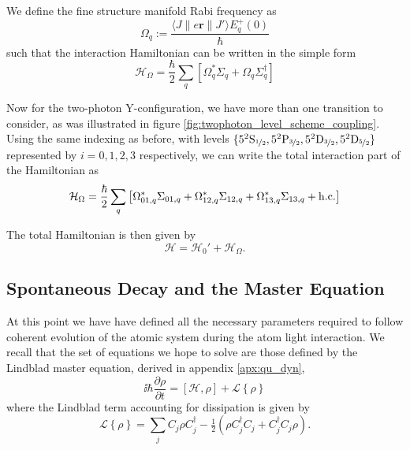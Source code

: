     We define the fine structure manifold Rabi frequency as 
    \begin{equation}
      \Omega_q := \frac{\langle J  \| e \mathbf{r} \| J' \rangle E^+_q(0)}{\hbar}
    \end{equation}
    such that the interaction Hamiltonian can be written in the simple form
    \begin{equation}
      \mathcal{H}_\Omega = \frac{\hbar}{2} \sum_q \left[ \Omega^*_q \Sigma_q + 
        \Omega_q \Sigma_q^\dag \right]
    \end{equation}

    Now for the two-photon Y-configuration, we have more than one transition to
    consider, as was illustrated in figure
    \ref{fig:twophoton_level_scheme_coupling}. Using the same indexing as
    before,  with levels $\{ 5^2\rm{S}_{\nicefrac{1}{2}},
    5^2\rm{P}_{\nicefrac{3}{2}}, 5^2\rm{D}_{\nicefrac{3}{2}},
    5^2\rm{D}_{\nicefrac{5}{2}} \}$ represented by $i = {0,1,2,3}$
    respectively, we can write the total interaction part of the Hamiltonian as
    \begin{equation}
      \mathcal{H}_{\Omega} = \frac{\hbar}{2} \sum_q \left[ \Omega^*_{01,q} 
      \Sigma_{01,q} + \Omega^*_{12,q} \Sigma_{12,q} + \Omega^*_{13,q} 
      \Sigma_{13,q} + \mathrm{h.c.} \right] 
    \end{equation}

    The total Hamiltonian is then given by
    \begin{equation}
      \mathcal{H} = \mathcal{H}_0' + \mathcal{H}_\Omega.
    \end{equation}

  \subsection{Spontaneous Decay and the Master Equation} %

    At this point we have have defined all the necessary parameters required to
    follow coherent evolution of the atomic system during the atom light
    interaction. We recall that the set of equations we hope to solve are those
    defined by the Lindblad master equation, derived in appendix
    \ref{apx:qu_dyn},
    \begin{equation}\label{eqn:lindblad_twophoton}
      \ii \hbar \frac{\partial \rho}{\partial t} = [\mathcal{H}, \rho] + 
        \mathcal{L}\left\{ \rho \right\}
    \end{equation}
    where the Lindblad term accounting for dissipation is given by
        \begin{equation}
      \mathcal{L}\left\{ \rho \right\} = 
        \sum_j{C_j \rho C_j^\dagger - \tfrac{1}{2}\left(\rho C_j^\dagger C_j + 
            C_j^\dagger C_j \rho \right)}.
      \label{eqn:lindblad_op_twophoton}
    \end{equation}   


